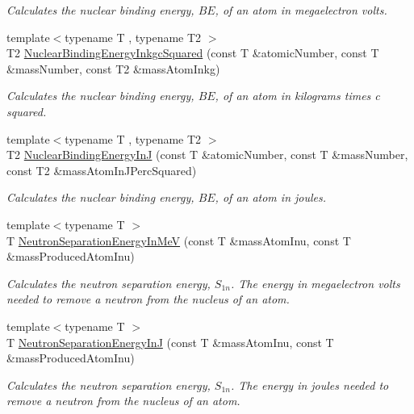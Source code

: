 \begin{DoxyCompactItemize}
\begin{DoxyCompactList}\small\item\em Calculates the nuclear binding energy, $BE$, of an atom in megaelectron volts. \end{DoxyCompactList}\item 
{\footnotesize template$<$typename T , typename T2 $>$ }\\T2 \mbox{\hyperlink{group___e_g_x_phys-_nuclear_binding_energy_gaf229d8c0d2aa30ff95aa20e5213df3bd}{Nuclear\+Binding\+Energy\+Inkgc\+Squared}} (const T \&atomic\+Number, const T \&mass\+Number, const T2 \&mass\+Atom\+Inkg)
\begin{DoxyCompactList}\small\item\em Calculates the nuclear binding energy, $BE$, of an atom in kilograms times c squared. \end{DoxyCompactList}\item 
{\footnotesize template$<$typename T , typename T2 $>$ }\\T2 \mbox{\hyperlink{group___e_g_x_phys-_nuclear_binding_energy_gae48a95188d9b71b36d02babf227b9449}{Nuclear\+Binding\+Energy\+InJ}} (const T \&atomic\+Number, const T \&mass\+Number, const T2 \&mass\+Atom\+In\+J\+Perc\+Squared)
\begin{DoxyCompactList}\small\item\em Calculates the nuclear binding energy, $BE$, of an atom in joules. \end{DoxyCompactList}\item 
{\footnotesize template$<$typename T $>$ }\\T \mbox{\hyperlink{group___e_g_x_phys-_nuclear_separation_energy_ga66133edb5809c81dd9fd60e09ebbef79}{Neutron\+Separation\+Energy\+In\+MeV}} (const T \&mass\+Atom\+Inu, const T \&mass\+Produced\+Atom\+Inu)
\begin{DoxyCompactList}\small\item\em Calculates the neutron separation energy, $S_{1n}$. The energy in megaelectron volts needed to remove a neutron from the nucleus of an atom. \end{DoxyCompactList}\item 
{\footnotesize template$<$typename T $>$ }\\T \mbox{\hyperlink{group___e_g_x_phys-_nuclear_separation_energy_ga14a4bb972ae000ef4ff35f2734ff22d0}{Neutron\+Separation\+Energy\+InJ}} (const T \&mass\+Atom\+Inu, const T \&mass\+Produced\+Atom\+Inu)
\begin{DoxyCompactList}\small\item\em Calculates the neutron separation energy, $S_{1n}$. The energy in joules needed to remove a neutron from the nucleus of an atom. \end{DoxyCompactList}\item 

\end{DoxyCompactItemize}
